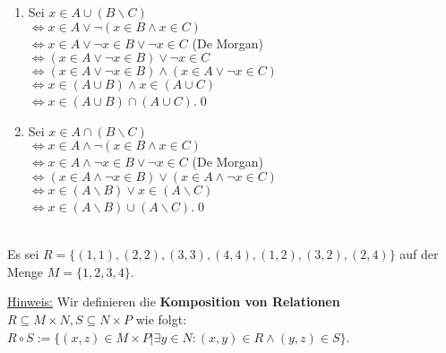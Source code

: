\begin{loesung}
\begin{enumerate}
        $\Leftrightarrow x\in (A\backslash B)\vee x\in (A\backslash C)$\\
        $\Leftrightarrow x\in (A\backslash B)\cup (A\backslash C)$.\qed
        \item Sei $x\in A\cup (B\backslash C)$\\
        $\Leftrightarrow x\in A\vee \neg (x\in B\wedge x\in C)$\\
        $\Leftrightarrow x\in A\vee \neg x\in B\vee \neg x\in C$ (De Morgan)\\
        $\Leftrightarrow (x\in A\vee \neg x\in B)\vee \neg x\in C$\\
        $\Leftrightarrow (x\in A\vee \neg x\in B)\wedge (x\in A\vee \neg x\in C)$\\
        $\Leftrightarrow x\in (A\cup B)\wedge x\in (A\cup C)$\\
        $\Leftrightarrow x\in (A\cup B)\cap (A\cup C)$.\qed
        \item Sei $x\in A\cap (B\backslash C)$\\
        $\Leftrightarrow x\in A\wedge \neg (x\in B\wedge x\in C)$\\
        $\Leftrightarrow x\in A\wedge \neg x\in B\vee \neg x\in C$ (De Morgan)\\
        $\Leftrightarrow (x\in A\wedge \neg x\in B)\vee (x\in A\wedge \neg x\in C)$\\
        $\Leftrightarrow x\in (A\backslash B)\vee x\in (A\backslash C)$\\
        $\Leftrightarrow x\in (A\backslash B)\cup (A\backslash C)$.\qed
    \end{enumerate}
\end{loesung}



\\
Es sei $R=\{(1,1),(2,2),(3,3),(4,4),(1,2),(3,2),(2,4)\}$ auf der Menge $M=\{1,2,3,4\}$.

\underline{Hinweis:} Wir definieren die \textbf{Komposition von Relationen} $R\subseteq M\times N, S\subseteq N\times P$ wie folgt: $R\circ S:=\{(x,z)\in M\times P|\exists y\in N: (x,y)\in R\wedge (y,z)\in S\}$.


